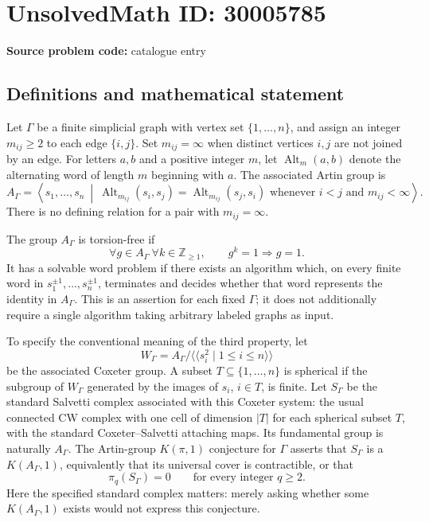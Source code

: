 \documentclass[11pt]{article}
\newcommand{\Z}{\mathbb{Z}}
\begin{document}
\section*{UnsolvedMath ID: 30005785}
\textbf{Source problem code:} catalogue entry
\subsection{Definitions and mathematical statement}
Let \(\Gamma\) be a finite simplicial graph with vertex set \(\{1,\ldots,n\}\), and assign an integer \(m_{ij}\geq 2\) to each edge \(\{i,j\}\). Set \(m_{ij}=\infty\) when distinct vertices \(i,j\) are not joined by an edge. For letters \(a,b\) and a positive integer \(m\), let \(\operatorname{Alt}_m(a,b)\) denote the alternating word of length \(m\) beginning with \(a\). The associated Artin group is
\[
A_\Gamma=\left\langle s_1,\ldots,s_n\ \middle|\ \operatorname{Alt}_{m_{ij}}(s_i,s_j)=\operatorname{Alt}_{m_{ij}}(s_j,s_i)\text{ whenever }i<j\text{ and }m_{ij}<\infty\right\rangle.
\]
There is no defining relation for a pair with \(m_{ij}=\infty\).

The group \(A_\Gamma\) is torsion-free if
\[
\forall g\in A_\Gamma\ \forall k\in\Z_{\geq 1},\qquad g^k=1\Longrightarrow g=1.
\]
It has a solvable word problem if there exists an algorithm which, on every finite word in \(s_1^{\pm1},\ldots,s_n^{\pm1}\), terminates and decides whether that word represents the identity in \(A_\Gamma\). This is an assertion for each fixed \(\Gamma\); it does not additionally require a single algorithm taking arbitrary labeled graphs as input.

To specify the conventional meaning of the third property, let
\[
W_\Gamma=A_\Gamma/\langle\!\langle s_i^2\mid 1\leq i\leq n\rangle\!\rangle
\]
be the associated Coxeter group. A subset \(T\subseteq\{1,\ldots,n\}\) is spherical if the subgroup of \(W_\Gamma\) generated by the images of \(s_i\), \(i\in T\), is finite. Let \(S_\Gamma\) be the standard Salvetti complex associated with this Coxeter system: the usual connected CW complex with one cell of dimension \(|T|\) for each spherical subset \(T\), with the standard Coxeter--Salvetti attaching maps. Its fundamental group is naturally \(A_\Gamma\). The Artin-group \(K(\pi,1)\) conjecture for \(\Gamma\) asserts that \(S_\Gamma\) is a \(K(A_\Gamma,1)\), equivalently that its universal cover is contractible, or that
\[
\pi_q(S_\Gamma)=0\qquad\text{for every integer }q\geq 2.
\]
Here the specified standard complex matters: merely asking whether some \(K(A_\Gamma,1)\) exists would not express this conjecture.
\end{document}
